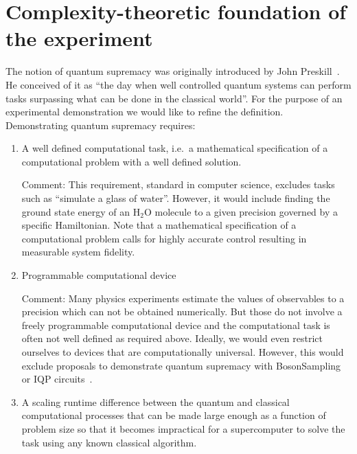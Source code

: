 
\section{Complexity-theoretic foundation of the experiment}\label{sec:complexity}

The notion of quantum supremacy was originally introduced by John Preskill~\cite{preskill_2012}. He conceived of it as ``the day when well controlled quantum systems can perform tasks surpassing what can be done in the classical world''. For the purpose of an experimental demonstration we would like to refine the definition.
\\
\newline
\noindent Demonstrating quantum supremacy requires:
\begin{enumerate}
\item A well defined computational task, i.e.~a mathematical specification of a computational problem with a well defined solution. 

Comment: This requirement, standard in computer science, excludes tasks such as ``simulate a glass of water''. However, it would include finding the ground state energy of an H$_{2}$O molecule to a given precision governed by a specific Hamiltonian. Note that a mathematical specification of a computational problem calls for highly accurate control resulting in measurable system fidelity. 

\item Programmable computational device

Comment: Many physics experiments estimate the values of observables to a precision which can not be obtained numerically. But those do not involve a freely programmable computational device and the computational task is often not well defined as required above. Ideally, we would even restrict ourselves to devices that are computationally universal. However, this would exclude proposals to demonstrate quantum supremacy with BosonSampling~\cite{AA11} or IQP circuits~\cite{BM16}.

\item A scaling runtime difference between the quantum and classical computational processes that can be made large enough as a function of problem size so that it becomes impractical for a supercomputer to solve the task using any known classical algorithm. 


\end{enumerate}
